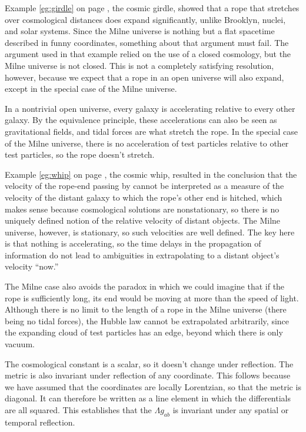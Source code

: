 Example \ref{eg:girdle} on page \pageref{eg:girdle}, the cosmic girdle, showed that a rope
that stretches over cosmological distances does expand significantly, unlike Brooklyn, nuclei, and solar systems.
Since the Milne universe is nothing but a flat spacetime described in funny coordinates, something about
that argument must fail. The argument used in that example relied on the use of a closed cosmology,
but the Milne universe is not closed. This is not a completely satisfying resolution, however, because
we expect that a rope in an open universe will also expand, except in the special case of the Milne universe.

In a nontrivial open universe, every galaxy is accelerating relative to every other galaxy. By the equivalence
principle, these accelerations can also be seen as gravitational fields, and tidal forces are what
stretch the rope. In the special case of the Milne universe, there is no acceleration of test particles
relative to other test particles, so the rope doesn't stretch.

Example \ref{eg:whip} on page \pageref{eg:whip}, the cosmic whip, resulted in the conclusion that the
velocity of the rope-end passing by cannot be interpreted as a measure of the velocity of the distant
galaxy to which the rope's other end is hitched, which makes sense because cosmological solutions are
nonstationary, so there is no uniquely defined notion of the relative velocity of distant objects.
The Milne universe, however, is stationary, so such velocities are well defined. The key here is that
nothing is accelerating, so the time delays in the propagation of information do not lead to ambiguities
in extrapolating to a distant object's velocity ``now.''

The Milne case also avoids the paradox in which we could imagine that if the rope is sufficiently long,
its end would be moving at more than the speed of light. Although there is no limit to the length of
a rope in the Milne universe (there being no tidal forces), the Hubble law cannot be extrapolated arbitrarily,
since the expanding cloud of test particles has an edge, beyond which there is only vacuum.

The cosmological constant is a scalar, so it doesn't change under reflection. The metric is also invariant
under reflection of any coordinate. This follows because we have assumed that the coordinates are locally Lorentzian,
so that the metric is diagonal. It can therefore be written as a line element in which the differentials are all
squared. This establishes that the $\Lambda g_{ab}$ is invariant under any spatial or temporal reflection.

